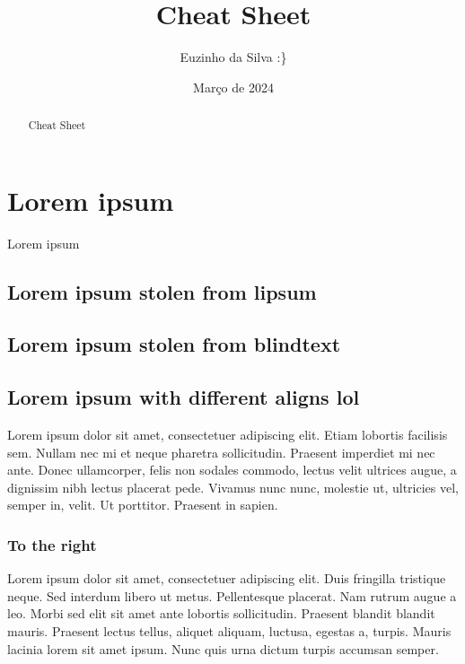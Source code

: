 \documentclass[a4paper,12pt]{article}
\title{Cheat Sheet}
\author{Euzinho da Silva :\}}
\date{Março de 2024}
\begin{document}
\maketitle

\begin{abstract}
    Cheat Sheet
\end{abstract}

\section{Lorem ipsum}
Lorem ipsum

\subsection{Lorem ipsum stolen from lipsum}
\lipsum[1-2]

\subsection{Lorem ipsum stolen from blindtext}
\blindtext[2]

\subsection{Lorem ipsum with different aligns lol}
\begin{center}
Lorem ipsum dolor sit amet, consectetuer adipiscing elit. Etiam lobortis facilisis sem. Nullam nec mi et neque pharetra sollicitudin. Praesent imperdiet mi nec ante. Donec ullamcorper, felis non sodales commodo, lectus velit ultrices augue, a dignissim nibh lectus placerat pede. Vivamus nunc nunc, molestie ut, ultricies vel, semper in, velit. Ut porttitor. Praesent in sapien.
\end{center}

\subsubsection{To the right}
\begin{flushright}
Lorem ipsum dolor sit amet, consectetuer adipiscing elit. Duis fringilla tristique neque. Sed interdum libero ut metus. Pellentesque placerat. Nam rutrum augue a leo. Morbi sed elit sit amet ante lobortis sollicitudin. Praesent blandit blandit mauris. Praesent lectus tellus, aliquet aliquam, luctusa, egestas a, turpis. Mauris lacinia lorem sit amet ipsum. Nunc quis urna dictum turpis accumsan semper.
\end{flushright}
\end{document}
